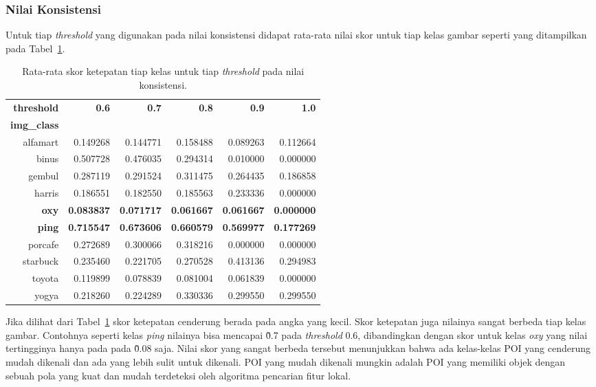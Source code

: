\subsubsection{Nilai Konsistensi}
Untuk tiap \textit{threshold} yang digunakan pada nilai konsistensi didapat rata-rata nilai skor untuk tiap kelas gambar seperti yang ditampilkan pada Tabel~\ref{tab:rata_kelas_konsistensi}. 
\begin{table}[H]
	\centering
	\begin{tabular}{|r|r|r|r|r|r|}
		\hline
		\textbf{threshold}  & \multirow{2}{*}{\textbf{0.6}} & \multirow{2}{*}{\textbf{0.7}} & \multirow{2}{*}{\textbf{0.8}} & \multirow{2}{*}{\textbf{0.9}} & \multirow{2}{*}{\textbf{1.0}} \\ \cline{1-1}
		\textbf{img\_class}  &       &       &       &       &          \\ \hline
		alfamart & 0.149268 & 0.144771 & 0.158488 & 0.089263 & 0.112664 \\ \hline
		binus    & 0.507728 & 0.476035 & 0.294314 & 0.010000 & 0.000000 \\ \hline
		gembul   & 0.287119 & 0.291524 & 0.311475 & 0.264435 & 0.186858 \\ \hline
		harris   & 0.186551 & 0.182550 & 0.185563 & 0.233336 & 0.000000 \\ \hline
		\textbf{oxy}      & \textbf{0.083837} & \textbf{0.071717} & \textbf{0.061667} & \textbf{0.061667} & \textbf{0.000000} \\ \hline
		\textbf{ping}     & \textbf{0.715547} & \textbf{0.673606} & \textbf{0.660579} & \textbf{0.569977} & \textbf{0.177269} \\ \hline
		porcafe  & 0.272689 & 0.300066 & 0.318216 & 0.000000 & 0.000000 \\ \hline
		starbuck & 0.235460 & 0.221705 & 0.270528 & 0.413136 & 0.294983 \\ \hline
		toyota   & 0.119899 & 0.078839 & 0.081004 & 0.061839 & 0.000000 \\ \hline
		yogya    & 0.218260 & 0.224289 & 0.330336 & 0.299550 & 0.299550 \\ \hline
	\end{tabular}
	\caption{Rata-rata skor ketepatan tiap kelas untuk tiap \textit{threshold} pada nilai konsistensi.}
	\label{tab:rata_kelas_konsistensi}
\end{table}
Jika dilihat dari Tabel~\ref{tab:rata_kelas_konsistensi} skor ketepatan cenderung berada pada angka yang kecil. Skor ketepatan juga nilainya sangat berbeda tiap kelas gambar. Contohnya seperti kelas \textit{ping} nilainya bisa mencapai \~0.7 pada \textit{threshold} 0.6, dibandingkan dengan skor untuk kelas \textit{oxy} yang nilai tertingginya hanya pada pada \~0.08 saja. Nilai skor yang sangat berbeda tersebut menunjukkan bahwa ada kelas-kelas POI yang cenderung mudah dikenali dan ada yang lebih sulit untuk dikenali. POI yang mudah dikenali mungkin adalah POI yang memiliki objek dengan sebuah pola yang kuat dan mudah terdeteksi oleh algoritma pencarian fitur lokal.

